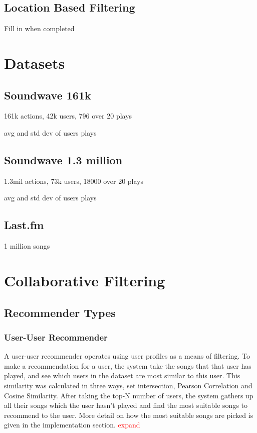 \documentclass[12pt]{article}
\newcommand\todo[1]{\textcolor{red}{#1}}
\begin{document}
	\subsection{Location Based Filtering}
	
Fill in when completed

\pagebreak
\section{Datasets}
	\subsection{Soundwave 161k}
	161k actions, 42k users, 796 over 20 plays
	
	
	avg and std dev of users plays
	\subsection{Soundwave 1.3 million}
	1.3mil actions, 73k users, 18000 over 20 plays
	
	
	avg and std dev of users plays
	\subsection{Last.fm}
	
	1 million songs
	
\pagebreak	
\section{Collaborative Filtering}
	
	\subsection{ Recommender Types}
		\subsubsection{User-User Recommender}
A user-user recommender operates using user profiles as a means of filtering. To make a recommendation for a user, the system take the songs that that user has played, and see which users in the dataset are most similar to this user. This similarity was calculated in three ways, set intersection, Pearson Correlation and Cosine Similarity. After taking the top-N number of users, the system gathers up all their songs which the user hasn't played and find the most suitable songs to recommend to the user. More detail on how the most suitable songs are picked is given in the implementation section. \todo{expand}
\end{document}
